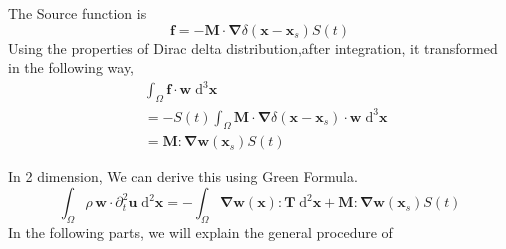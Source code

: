 \documentclass{book}
\begin{document}
The Source function is 
\begin{equation}
 \boldsymbol{f} = -\boldsymbol{M}\cdot\boldsymbol\nabla\delta(\boldsymbol x-\boldsymbol x_s)S(t)
\end{equation}
Using the properties of Dirac delta distribution,after integration, it transformed in the following way,
\begin{equation}
\begin{aligned}
 &\int_\Omega \boldsymbol f\cdot \boldsymbol w\;\mathrm{d}^3\boldsymbol x\\
 &= -S(t)\int_\Omega\boldsymbol{M}\cdot \boldsymbol\nabla\delta(\boldsymbol x-\boldsymbol x_s)\cdot \boldsymbol w\;\mathrm{d}^3\boldsymbol x\\
 &= \boldsymbol{M}:\boldsymbol{\nabla w}(\boldsymbol x_s)S (t)
\end{aligned}
\end{equation}

In 2 dimension, We can derive this using Green Formula. 
\begin{equation}
 \int_\Omega \rho\,\boldsymbol w\cdot \partial_t^2\boldsymbol u\;\mathrm{d}^2\boldsymbol x = -\int_\Omega \boldsymbol{\nabla}\boldsymbol w(\boldsymbol x): \boldsymbol T\;\mathrm{d}^2\boldsymbol x + \boldsymbol{M}:\boldsymbol{\nabla w}(\boldsymbol x_s)S (t)
\end{equation}
In the following parts, we will explain the general procedure of 








  
\end{document}
